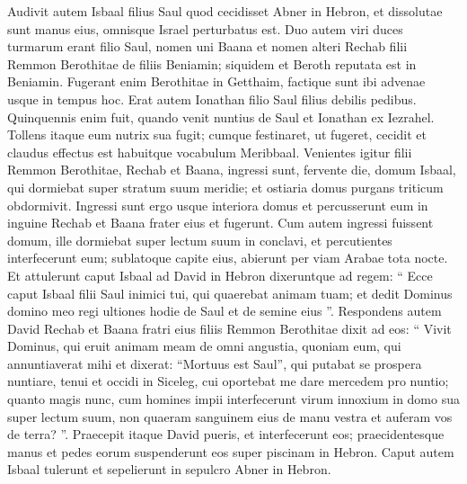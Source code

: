 \begin{biblechapter}
\begin{biblechapter}
\begin{biblechapter}
\begin{biblechapter}
\verse Audivit autem Isbaal filius Saul quod cecidisset Abner in Hebron, et dissolutae sunt manus eius, omnisque Israel perturbatus est. 
\verse Duo autem viri duces turmarum erant filio Saul, nomen uni Baana et nomen alteri Rechab filii Remmon Berothitae de filiis Beniamin; siquidem et Beroth reputata est in Beniamin. 
\verse Fugerant enim Berothitae in Getthaim, factique sunt ibi advenae usque in tempus hoc.
 \verse Erat autem Ionathan filio Saul filius debilis pedibus. Quinquennis enim fuit, quando venit nuntius de Saul et Ionathan ex Iezrahel. Tollens itaque eum nutrix sua fugit; cumque festinaret, ut fugeret, cecidit et claudus effectus est habuitque vocabulum Meribbaal.
 \verse Venientes igitur filii Remmon Berothitae, Rechab et Baana, ingressi sunt, fervente die, domum Isbaal, qui dormiebat super stratum suum meridie; et ostiaria domus purgans triticum obdormivit. 
\verse Ingressi sunt ergo usque interiora domus et percusserunt eum in inguine Rechab et Baana frater eius et fugerunt. 
\verse Cum autem ingressi fuissent domum, ille dormiebat super lectum suum in conclavi, et percutientes interfecerunt eum; sublatoque capite eius, abierunt per viam Arabae tota nocte.
 \verse Et attulerunt caput Isbaal ad David in Hebron dixeruntque ad regem: “ Ecce caput Isbaal filii Saul inimici tui, qui quaerebat animam tuam; et dedit Dominus domino meo regi ultiones hodie de Saul et de semine eius ”. 
\verse Respondens autem David Rechab et Baana fratri eius filiis Remmon Berothitae dixit ad eos: “ Vivit Dominus, qui eruit animam meam de omni angustia, 
\verse quoniam eum, qui annuntiaverat mihi et dixerat: “Mortuus est Saul”, qui putabat se prospera nuntiare, tenui et occidi in Siceleg, cui oportebat me dare mercedem pro nuntio; 
\verse quanto magis nunc, cum homines impii interfecerunt virum innoxium in domo sua super lectum suum, non quaeram sanguinem eius de manu vestra et auferam vos de terra? ”. 
\verse Praecepit itaque David pueris, et interfecerunt eos; praecidentesque manus et pedes eorum suspenderunt eos super piscinam in Hebron. Caput autem Isbaal tulerunt et sepelierunt in sepulcro Abner in Hebron.
 

\end{biblechapter}
\end{biblechapter}
\end{biblechapter}
\end{biblechapter}
